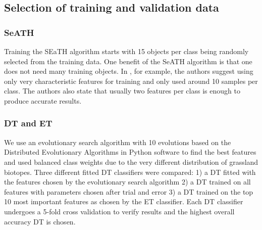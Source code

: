 \documentclass[authoryear, review,12pt,number]{elsarticle}
\begin{document}
\subsection{Selection of training and validation data}
\subsubsection{SeATH}
Training the SEaTH algorithm starts with 15 objects per class being randomly 
selected from the training data. One benefit of the SeATH algorithm is that one 
does not need many training objects. In \cite{Nussbaum2006}, for example, the 
authors suggest using only very characteristic features for training and only 
used around 10 samples per class. The authors also state that usually two 
features per class is enough to produce accurate results.
\subsubsection{DT and ET}
We use an evolutionary search algorithm with 10 evolutions based on the 
Distributed Evolutionary Algorithms in Python \citep{DEAP_JMLR2012} software to 
find the best features and used balanced class weights due to the very 
different distribution of grassland biotopes.  Three different fitted DT 
classifiers were compared: 1) a DT fitted with the features chosen by the 
evolutionary search algorithm 2) a DT trained on all features with parameters 
chosen after trial and error 3) a DT trained on the top 10 most important 
features as chosen by the ET classifier. Each DT classifier undergoes a 5-fold 
cross validation to verify results and the highest overall accuracy DT is 
chosen.
\label{subsec:rulegen_data_mining}
\end{document}
